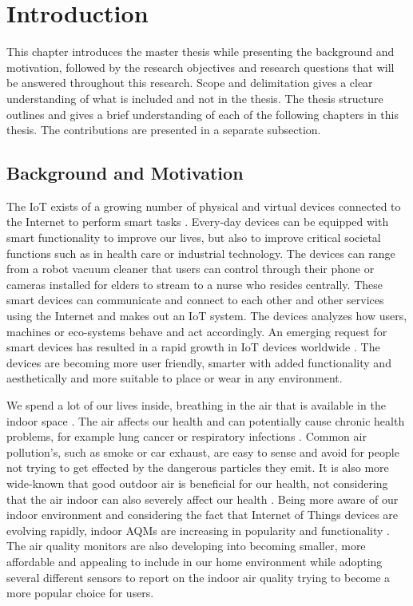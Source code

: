 \chapter{Introduction}
This chapter introduces the master thesis while presenting the background and motivation, followed by the research objectives and research questions that will be answered throughout this research. Scope and delimitation gives a clear understanding of what is included and not in the thesis. The thesis structure outlines and gives a brief understanding of each of the following chapters in this thesis. The contributions are presented in a separate subsection. 

\section{Background and Motivation}
The \gls{IoT} exists of a growing number of physical and virtual devices connected to the Internet to perform smart tasks \cite{IoTSurveyAl-Fuqaha}. Every-day devices can be equipped with smart functionality to improve our lives, but also to improve critical societal functions such as in health care or industrial technology. The devices can range from a robot vacuum cleaner that users can control through their phone or cameras installed for elders to stream to a nurse who resides centrally. These smart devices can communicate and connect to each other and other services using the Internet and makes out an \gls{IoT} system. The devices analyzes how users, machines or eco-systems behave and act accordingly. An emerging request for smart devices has resulted in a rapid growth in \gls{IoT} devices worldwide \cite{IoTAndPrivacy}. The devices are becoming more user friendly, smarter with added functionality and aesthetically and more suitable to place or wear in any environment. 

We spend a lot of our lives inside, breathing in the air that is available in the indoor space \cite{IndoorAirQualityMonitorIoT}. The air affects our health and can potentially cause chronic health problems, for example lung cancer or respiratory infections \cite{IAQMonitorReview}. Common air pollution's, such as smoke or car exhaust, are easy to sense and avoid for people not trying to get effected by the dangerous particles they emit. It is also more wide-known that good outdoor air is beneficial for our health, not considering that the air indoor can also severely affect our health \cite{IndoorAirQuality}. Being more aware of our indoor environment and considering the fact that Internet of Things devices are evolving rapidly, indoor \gls{AQM}s are increasing in popularity and functionality \cite{SecurityAndDataIntInAQM}. The air quality monitors are also developing into becoming smaller, more affordable and appealing to include in our home environment while adopting several different sensors to report on the indoor air quality trying to become a more popular choice for users. 


